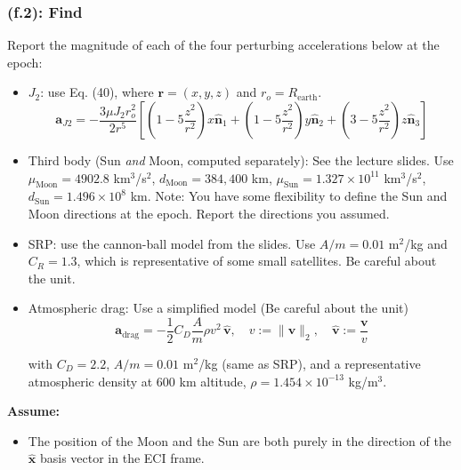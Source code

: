 \documentclass[titlepage]{article}
\begin{document}
\subsubsection*{(f.2): Find}
Report the magnitude of each of the four perturbing accelerations below at the epoch:
\begin{itemize}
	\item $J_2$: use Eq. (40), where $\boldsymbol{r} = (x,y,z)$ and $r_o = R_{\text{earth}}$.
	\small
	\begin{equation}
		\boldsymbol{a}_{J2} = -\frac{3\mu J_2 r_o^2}{2r^5}\left[\left(1-5\frac{z^2}{r^2}\right)x\hat{\boldsymbol{n}}_1 + \left(1-5\frac{z^2}{r^2}\right)y\hat{\boldsymbol{n}}_2 + \left(3-5\frac{z^2}{r^2}\right)z\hat{\boldsymbol{n}}_3\right]
	\end{equation}
	\normalsize
	
	\item Third body (Sun \textit{and} Moon, computed separately): See the lecture slides. Use $\mu_{\text{Moon}} = 4902.8$ km$^3$/s$^2$, $d_{\text{Moon}} = 384{,}400$ km, $\mu_{\text{Sun}} = 1.327\times10^{11}$ km$^3$/s$^2$, $d_{\text{Sun}} = 1.496\times10^8$ km.
	Note: You have some flexibility to define the Sun and Moon directions at the epoch. Report the directions you assumed.
	
	\item SRP: use the cannon-ball model from the slides. Use $A/m = 0.01$ m$^2$/kg and $C_R = 1.3$, which is representative of some small satellites. Be careful about the unit.
	
	\item Atmospheric drag: Use a simplified model (Be careful about the unit)
	\begin{equation}
		\boldsymbol{a}_{\text{drag}} = -\frac{1}{2}C_D\frac{A}{m}\rho v^2\,\hat{\boldsymbol{v}}, \quad v := \|\boldsymbol{v}\|_2, \quad \hat{\boldsymbol{v}} := \frac{\boldsymbol{v}}{v}
	\end{equation}
	
	with $C_D = 2.2$, $A/m = 0.01$ m$^2$/kg (same as SRP), and a representative atmospheric density at 600 km altitude, $\rho = 1.454\times10^{-13}$ kg/m$^3$.
\end{itemize}

\textbf{Assume:}
\begin{itemize}
	\item The position of the Moon and the Sun are both purely in the direction of the $\hat{\boldsymbol{x}}$ basis vector in the ECI frame.
\end{itemize}
\end{document}
